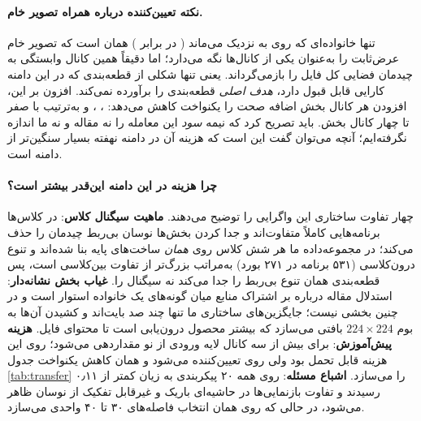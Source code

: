 \paragraph{نکته تعیین‌کننده درباره  همراه تصویر خام.} تنها خانواده‌ای که روی  به  نزدیک می‌ماند ( در برابر ) همان است که تصویر خام عرض‌ثابت را به‌عنوان یکی از کانال‌ها نگه می‌دارد؛ اما دقیقاً همین کانال وابستگی به چیدمان فضایی کل فایل را بازمی‌گرداند. یعنی تنها شکلی از قطعه‌بندی که در این دامنه کارایی قابل قبول دارد، \emph{هدف اصلی} قطعه‌بندی را برآورده نمی‌کند. افزون بر این، افزودن هر کانال بخش اضافه صحت را یکنواخت کاهش می‌دهد: ، ،  و  به‌ترتیب با صفر تا چهار کانال بخش. باید تصریح کرد که نیمه \emph{سود} این معامله را نه مقاله و نه ما اندازه نگرفته‌ایم؛ آنچه می‌توان گفت این است که هزینه آن در دامنه نهفته بسیار سنگین‌تر از دامنه  است.

\paragraph{چرا هزینه در این دامنه این‌قدر بیشتر است؟} چهار تفاوت ساختاری این واگرایی را توضیح می‌دهند. \textbf{ماهیت سیگنال کلاس}: در  کلاس‌ها برنامه‌هایی کاملاً متفاوت‌اند و جدا کردن بخش‌ها نوسان بی‌ربط چیدمان را حذف می‌کند؛ در مجموعه‌داده ما هر شش کلاس روی \emph{همان} ساخت‌های پایه بنا شده‌اند و تنوع درون‌کلاسی (۵۳۱ برنامه در ۲۷۱ بورد) به‌مراتب بزرگ‌تر از تفاوت بین‌کلاسی است، پس قطعه‌بندی همان تنوع بی‌ربط را جدا می‌کند نه سیگنال را. \textbf{غیاب بخش نشانه‌دار}: استدلال مقاله درباره  بر اشتراک منابع میان گونه‌های یک خانواده استوار است و در  چنین بخشی نیست؛ جایگزین‌های ساختاری ما تنها چند صد بایت‌اند و کشیدن آن‌ها به بوم $224 \times 224$ بافتی می‌سازد که بیشتر محصول درون‌یابی است تا محتوای فایل. \textbf{هزینه پیش‌آموزش}: برای بیش از سه کانال لایه ورودی از نو مقداردهی می‌شود؛ روی  این هزینه قابل تحمل بود ولی روی  تعیین‌کننده می‌شود و همان کاهش یکنواخت جدول \ref{tab:transfer} را می‌سازد. \textbf{اشباع مسئله}: روی  همه ۲۰ پیکربندی به زیان کمتر از \num{۰٫۱۱} رسیدند و تفاوت بازنمایی‌ها در حاشیه‌ای باریک و غیرقابل تفکیک از نوسان ظاهر می‌شود، در حالی که روی  همان انتخاب فاصله‌های ۳۰ تا ۴۰ واحدی می‌سازد.

